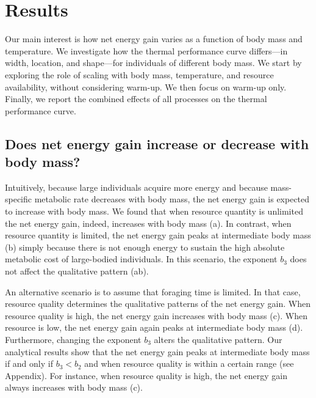 \section*{Results}

Our main interest is how net energy gain varies as a function of body mass and temperature.
We investigate how the thermal performance curve differs---in width, location, and shape---for individuals of different body mass.
We start by exploring the role of scaling with body mass, temperature, and resource availability, without considering warm-up.
We then focus on warm-up only.
Finally, we report the combined effects of all processes on the thermal performance curve.


\subsection*{Does net energy gain increase or decrease with body mass?}

Intuitively, because large individuals acquire more energy and because mass-specific metabolic rate decreases with body mass, the net energy gain is expected to increase with body mass.
We found that when resource quantity is unlimited the net energy gain, indeed, increases with body mass (a).
In contrast, when resource quantity is limited, the net energy gain peaks at intermediate body mass (b) simply because there is not enough energy to sustain the high absolute metabolic cost of large-bodied individuals.
In this scenario, the exponent $b_3$ does not affect the qualitative pattern (ab).

An alternative scenario is to assume that foraging time is limited.
In that case, resource quality determines the qualitative patterns of the net energy gain.
When resource quality is high, the net energy gain increases with body mass (c).
When resource is low, the net energy gain again peaks at intermediate body mass (d).
Furthermore, changing the exponent $b_3$ alters the qualitative pattern.
Our analytical results show that the net energy gain peaks at intermediate body mass if and only if $b_3 < b_2$ and when resource quality is within a certain range (see Appendix).
For instance, when resource quality is high, the net energy gain always increases with body mass (c).

